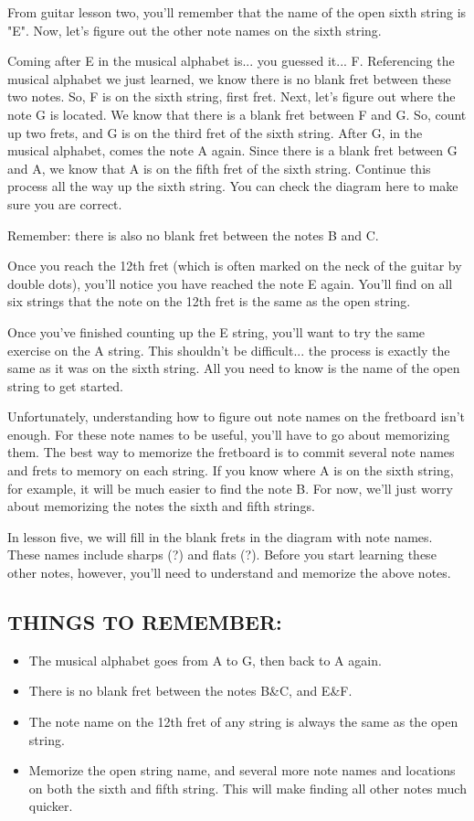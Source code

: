 From guitar lesson two, you'll remember that the name of the open sixth string is "E". Now, let's figure out the other note names on the sixth string.

Coming after E in the musical alphabet is... you guessed it... F. Referencing the musical alphabet we just learned, we know there is no blank fret between these two notes. So, F is on the sixth string, first fret. Next, let's figure out where the note G is located. We know that there is a blank fret between F and G. So, count up two frets, and G is on the third fret of the sixth string. After G, in the musical alphabet, comes the note A again. Since there is a blank fret between G and A, we know that A is on the fifth fret of the sixth string. Continue this process all the way up the sixth string. You can check the diagram here to make sure you are correct.

Remember: there is also no blank fret between the notes B and C.

Once you reach the 12th fret (which is often marked on the neck of the guitar by double dots), you'll notice you have reached the note E again. You'll find on all six strings that the note on the 12th fret is the same as the open string.

Once you've finished counting up the E string, you'll want to try the same exercise on the A string. This shouldn't be difficult... the process is exactly the same as it was on the sixth string. All you need to know is the name of the open string to get started.

Unfortunately, understanding how to figure out note names on the fretboard isn't enough. For these note names to be useful, you'll have to go about memorizing them. The best way to memorize the fretboard is to commit several note names and frets to memory on each string. If you know where A is on the sixth string, for example, it will be much easier to find the note B. For now, we'll just worry about memorizing the notes the sixth and fifth strings.

In lesson five, we will fill in the blank frets in the diagram with note names. These names include sharps (?) and flats (?). Before you start learning these other notes, however, you'll need to understand and memorize the above notes.

\subsection{THINGS TO REMEMBER:}
\begin{itemize}
\item The musical alphabet goes from A to G, then back to A again.
\item There is no blank fret between the notes B\&C, and E\&F.
\item The note name on the 12th fret of any string is always the same as the open string.
\item Memorize the open string name, and several more note names and locations on both the sixth and fifth string. This will make finding all other notes much quicker.
\end{itemize}

